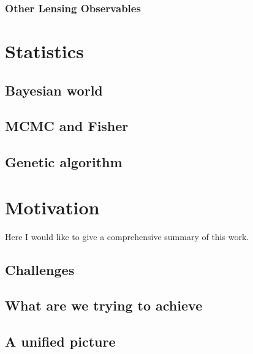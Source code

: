 \subsubsection{Other Lensing Observables}

\section{Statistics}
\subsection{Bayesian world}
\subsection{MCMC and Fisher}
\subsection{Genetic algorithm}

\section{Motivation}

Here I would like to give a comprehensive summary of this work.

\subsection{Challenges}
\subsection{What are we trying to achieve}
\subsection{A unified picture}



\clearpage
\cite{2014MNRAS.440.2290M}

\cite{2014MNRAS.439.2651M}

\cite{2014A&A...567A..65B}

\cite{2014MNRAS.445.3382M}

\cite{2014arXiv1410.6826M}

\cite{2015PASJ...67...21M}

\cite{2015arXiv150403388M}





